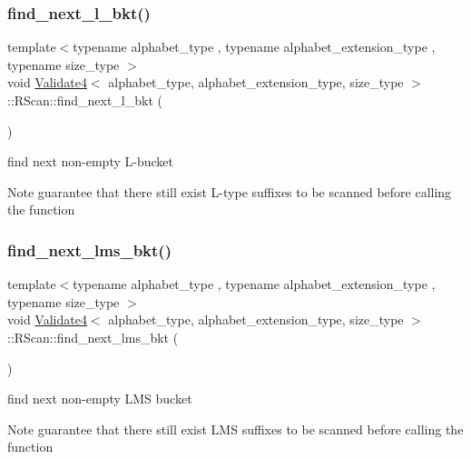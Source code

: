\subsubsection{\texorpdfstring{find\+\_\+next\+\_\+l\+\_\+bkt()}{find\_next\_l\_bkt()}}
{\footnotesize\ttfamily template$<$typename alphabet\+\_\+type , typename alphabet\+\_\+extension\+\_\+type , typename size\+\_\+type $>$ \\
void \hyperlink{class_validate4}{Validate4}$<$ alphabet\+\_\+type, alphabet\+\_\+extension\+\_\+type, size\+\_\+type $>$\+::R\+Scan\+::find\+\_\+next\+\_\+l\+\_\+bkt (\begin{DoxyParamCaption}{ }\end{DoxyParamCaption})\hspace{0.3cm}{\ttfamily [inline]}}



find next non-\/empty L-\/bucket 

\begin{DoxyNote}{Note}
guarantee that there still exist L-\/type suffixes to be scanned before calling the function 
\end{DoxyNote}
\mbox{\label{struct_validate4_1_1_r_scan_af8a20c45983e2d175f6bbc67dcbef719}} 
\subsubsection{\texorpdfstring{find\+\_\+next\+\_\+lms\+\_\+bkt()}{find\_next\_lms\_bkt()}}
{\footnotesize\ttfamily template$<$typename alphabet\+\_\+type , typename alphabet\+\_\+extension\+\_\+type , typename size\+\_\+type $>$ \\
void \hyperlink{class_validate4}{Validate4}$<$ alphabet\+\_\+type, alphabet\+\_\+extension\+\_\+type, size\+\_\+type $>$\+::R\+Scan\+::find\+\_\+next\+\_\+lms\+\_\+bkt (\begin{DoxyParamCaption}{ }\end{DoxyParamCaption})\hspace{0.3cm}{\ttfamily [inline]}}



find next non-\/empty L\+MS bucket 

\begin{DoxyNote}{Note}
guarantee that there still exist L\+MS suffixes to be scanned before calling the function 
\end{DoxyNote}
\mbox{\label{struct_validate4_1_1_r_scan_a8d691af43c806d0e3279c0121abf6ed7}} 
